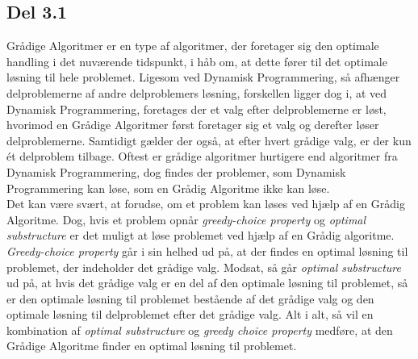 \documentclass{report}
\begin{document}
\subsection*{Del 3.1}
Grådige Algoritmer er en type af algoritmer, der foretager sig den optimale handling i det nuværende tidspunkt, i håb om, at dette fører til det optimale løsning til hele problemet. Ligesom ved Dynamisk Programmering, så afhænger delproblemerne af andre delproblemers løsning, forskellen ligger dog i, at ved Dynamisk Programmering, foretages der et valg efter delproblemerne er løst, hvorimod en Grådige Algoritmer først foretager sig et valg og derefter løser delproblemerne. Samtidigt gælder der også, at efter hvert grådige valg, er der kun ét delproblem tilbage. Oftest er grådige algoritmer hurtigere end algoritmer fra Dynamisk Programmering, dog findes der problemer, som Dynamisk Programmering kan løse, som en Grådig Algoritme ikke kan løse. \\ 
Det kan være svært,
 at forudse, om et problem kan løses ved hjælp af en Grådig Algoritme. Dog, hvis et problem opnår \textit{greedy-choice property} og \textit{optimal substructure} er det muligt at løse problemet ved hjælp af en Grådig algoritme. \\
\textit{Greedy-choice property} går i sin helhed ud på, at der findes en optimal løsning til problemet, der indeholder det grådige valg. Modsat, så går \textit{optimal substructure} ud på, at hvis det grådige valg er en del af den optimale løsning til problemet, så er den optimale løsning til problemet bestående af det grådige valg og den optimale løsning til delproblemet efter det grådige valg. Alt i alt, så vil en kombination af \textit{optimal substructure} og \textit{greedy choice property} medføre, at den Grådige Algoritme finder en optimal løsning til problemet.

\newpage 
\end{document}
